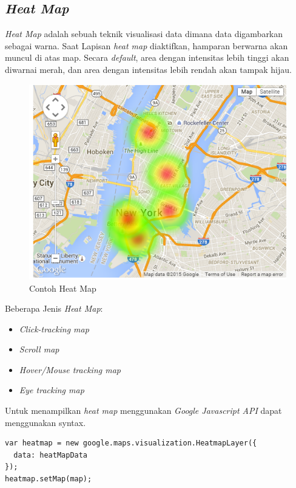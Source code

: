  \subsection{\textit{Heat Map}}
 \label{subsec:heat map}
 \textit{Heat Map} adalah sebuah teknik visualisasi data dimana data digambarkan sebagai warna. Saat Lapisan \textit{heat map} diaktifkan, hamparan berwarna akan muncul di atas map. Secara  \textit{default}, area dengan intensitas lebih tinggi akan diwarnai merah, dan area dengan intensitas lebih rendah akan tampak hijau.\cite{GoogleMaps:03:heatmap}

 \begin{figure}[H]
    \centering
    \includegraphics[scale=0.5]{Gambar/heat-map-example}
    \caption{Contoh Heat Map }
    \label{fig:my_label}
\end{figure}

Beberapa Jenis \textit{Heat Map}:
 \begin{itemize}
     \item \textit{Click-tracking map}
     \item \textit{Scroll map}
     \item \textit{Hover/Mouse tracking map}
     \item \textit{Eye tracking map}
 \end{itemize}
 
 Untuk menampilkan \textit{heat map } menggunakan \textit{Google Javascript API} dapat menggunakan syntax.
 \begin{lstlisting}
var heatmap = new google.maps.visualization.HeatmapLayer({
  data: heatMapData
});
heatmap.setMap(map);

\end{lstlisting}
 

